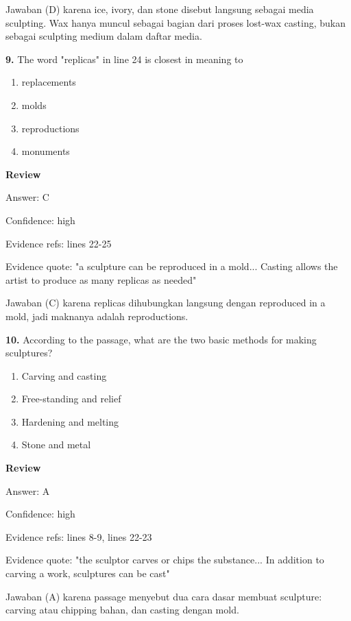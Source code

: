 \documentclass[12pt]{article}
\begin{document}
Jawaban (D) karena ice, ivory, dan stone disebut langsung sebagai media sculpting. Wax hanya muncul sebagai bagian dari proses lost-wax casting, bukan sebagai sculpting medium dalam daftar media.\par
\endgroup
\par
\vspace{0.25\baselineskip}
\noindent\textbf{9.} The word "replicas" in line 24 is closest in meaning to
\begin{enumerate}[label=(\Alph*),leftmargin=*,itemsep=0.2em]
\item replacements
\item molds
\item reproductions
\item monuments
\end{enumerate}
\par
\begingroup
\setlength{\parskip}{0pt}
\setlength{\parindent}{0pt}
\textbf{Review}\par
Answer: C\par
Confidence: high\par
Evidence refs: lines 22-25\par
Evidence quote: "a sculpture can be reproduced in a mold... Casting allows the artist to produce as many replicas as needed"\par
Jawaban (C) karena replicas dihubungkan langsung dengan reproduced in a mold, jadi maknanya adalah reproductions.\par
\endgroup
\par
\vspace{0.25\baselineskip}
\noindent\textbf{10.} According to the passage, what are the two basic methods for making sculptures?
\begin{enumerate}[label=(\Alph*),leftmargin=*,itemsep=0.2em]
\item Carving and casting
\item Free-standing and relief
\item Hardening and melting
\item Stone and metal
\end{enumerate}
\par
\begingroup
\setlength{\parskip}{0pt}
\setlength{\parindent}{0pt}
\textbf{Review}\par
Answer: A\par
Confidence: high\par
Evidence refs: lines 8-9, lines 22-23\par
Evidence quote: "the sculptor carves or chips the substance... In addition to carving a work, sculptures can be cast"\par
Jawaban (A) karena passage menyebut dua cara dasar membuat sculpture: carving atau chipping bahan, dan casting dengan mold.\par
\endgroup
\par
\vspace{0.25\baselineskip}
\end{document}

